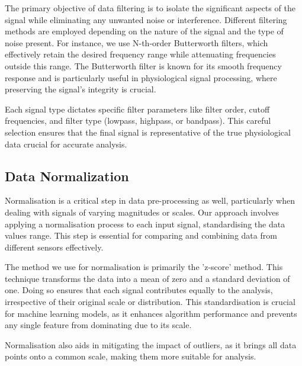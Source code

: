 The primary objective of data filtering is to isolate the significant aspects of the signal while eliminating any unwanted noise or interference. Different filtering methods are employed depending on the nature of the signal and the type of noise present. For instance, we use N-th-order Butterworth filters, which effectively retain the desired frequency range while attenuating frequencies outside this range. The Butterworth filter is known for its smooth frequency response and is particularly useful in physiological signal processing, where preserving the signal's integrity is crucial.

Each signal type dictates specific filter parameters like filter order, cutoff frequencies, and filter type (lowpass, highpass, or bandpass). This careful selection ensures that the final signal is representative of the true physiological data crucial for accurate analysis.

\subsection*{Data Normalization }
Normalisation is a critical step in data pre-processing as well, particularly when dealing with signals of varying magnitudes or scales. Our approach involves applying a normalisation process to each input signal, standardising the data values range. This step is essential for comparing and combining data from different sensors effectively.

The method we use for normalisation is primarily the 'z-score' method. This technique transforms the data into a mean of zero and a standard deviation of one. Doing so ensures that each signal contributes equally to the analysis, irrespective of their original scale or distribution. This standardisation is crucial for machine learning models, as it enhances algorithm performance and prevents any single feature from dominating due to its scale.

Normalisation also aids in mitigating the impact of outliers, as it brings all data points onto a common scale, making them more suitable for analysis.

